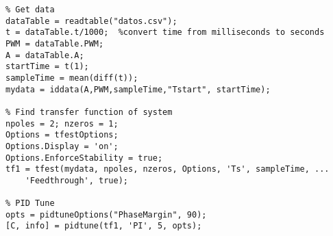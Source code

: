 \begin{verbatim}
% Get data
dataTable = readtable("datos.csv");
t = dataTable.t/1000;  %convert time from milliseconds to seconds
PWM = dataTable.PWM;
A = dataTable.A;
startTime = t(1);
sampleTime = mean(diff(t));
mydata = iddata(A,PWM,sampleTime,"Tstart", startTime);

% Find transfer function of system
npoles = 2; nzeros = 1;
Options = tfestOptions;
Options.Display = 'on';
Options.EnforceStability = true;
tf1 = tfest(mydata, npoles, nzeros, Options, 'Ts', sampleTime, ...
    'Feedthrough', true);

% PID Tune
opts = pidtuneOptions("PhaseMargin", 90);
[C, info] = pidtune(tf1, 'PI', 5, opts);
\end{verbatim}